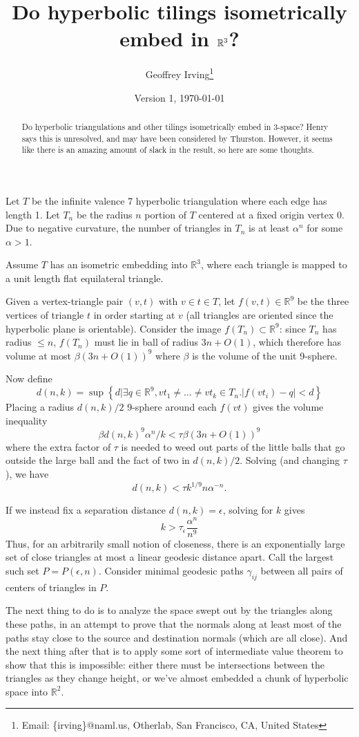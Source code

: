\documentclass[11pt]{article}
\title{Do hyperbolic tilings isometrically embed in $\R^3$?}
\author{Geoffrey Irving\thanks{Email: \{irving\}@naml.us, Otherlab, San Francisco, CA, United States}}
\date{Version 1, \today}
\newcommand{\R}{\mathbb{R}}
\begin{document}
\maketitle

\begin{abstract}
Do hyperbolic triangulations and other tilings isometrically embed in 3-space?
Henry says this is unresolved, and may have been considered by Thurston.
However, it seems like there is an amazing amount of slack in the result, so
here are some thoughts.
\end{abstract}

Let $T$ be the infinite valence 7 hyperbolic triangulation where each edge has length 1.
Let $T_n$ be the radius $n$ portion of $T$ centered at a fixed origin vertex $0$.  Due to negative
curvature, the number of triangles in $T_n$ is at least $\alpha^n$ for some $\alpha > 1$.

Assume $T$ has an isometric embedding into $\R^3$, where each triangle is mapped to a unit length flat
equilateral triangle.

Given a vertex-triangle pair $(v,t)$ with $v \in t \in T$, let $f(v,t) \in \R^9$ be the three vertices
of triangle $t$ in order starting at $v$ (all triangles are oriented since the hyperbolic plane is
orientable).  Consider the image $f(T_n) \subset \R^9$: since $T_n$ has radius $\le n$, $f(T_n)$ must
lie in ball of radius $3n+O(1)$, which therefore has volume at most $\beta (3n+O(1))^9$ where $\beta$
is the volume of the unit 9-sphere.

Now define
$$d(n,k) = \sup \left\{ d | \exists q \in \R^9, vt_1 \ne \ldots \ne vt_k \in T_n . \left|f(vt_i) - q\right| < d \right\}$$
Placing a radius $d(n,k)/2$ 9-sphere around each $f(vt)$ gives the volume inequality
$$\beta d(n,k)^9 \alpha^n / k < \tau \beta (3n+O(1))^9$$
where the extra factor of $\tau$ is needed to weed out parts of the little balls that go outside
the large ball and the fact of two in $d(n,k)/2$.  Solving (and changing $\tau$), we have
$$d(n,k) < \tau k^{1/9} n \alpha^{-n}.$$

If we instead fix a separation distance $d(n,k) = \epsilon$, solving for $k$ gives
$$k > \tau_\epsilon \frac{\alpha^n}{n^9}$$
Thus, for an arbitrarily small notion of closeness, there is an exponentially large set of close triangles
at most a linear geodesic distance apart.  Call the largest such set $P = P(\epsilon,n)$.
Consider minimal geodesic paths $\gamma_{ij}$ between all pairs of centers of triangles in $P$.

The next thing to do
is to analyze the space swept out by the triangles along these paths, in an attempt to prove that the normals
along at least most of the paths stay close to the source and destination normals (which are all close).
And the next thing after that is to apply some sort of intermediate value theorem to show that this is impossible:
either there must be intersections between the triangles as they change height, or we've almost embedded a chunk of
hyperbolic space into $\R^2$.
\end{document}
